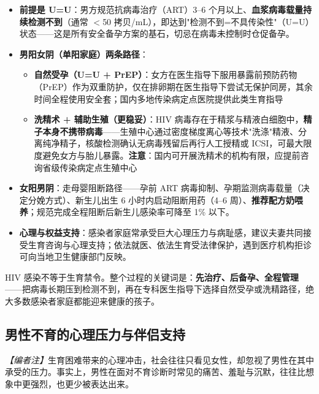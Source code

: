 \documentclass[12pt,a4paper,twoside]{ctexbook}
\begin{document}
\begin{itemize}
	\item \textbf{前提是 U=U}：男方规范抗病毒治疗（ART）3--6 个月以上、\textbf{血浆病毒载量持续检测不到}（通常 $<$50 拷贝/mL），即达到"检测不到=不具传染性"（U=U）状态——这是所有安全备孕方案的基石，切忌在病毒未控制时仓促备孕。
	\item \textbf{男阳女阴（单阳家庭）两条路径}：
	\begin{itemize}
		\item \textbf{自然受孕（U=U + PrEP）}：女方在医生指导下服用暴露前预防药物（PrEP）作为双重防护，仅在排卵期在医生指导下尝试无保护同房，其余时间全程使用安全套；国内多地传染病定点医院提供此类生育指导
		\item \textbf{洗精术 + 辅助生殖（更稳妥）}：HIV 病毒存在于精浆与精液白细胞中，\textbf{精子本身不携带病毒}——生殖中心通过密度梯度离心等技术"洗涤"精液、分离纯净精子，核酸检测确认无病毒残留后再行人工授精或 ICSI，可最大限度避免女方与胎儿暴露。\textbf{注意}：国内可开展洗精术的机构有限，应提前咨询省级传染病定点生殖中心
	\end{itemize}
	\item \textbf{女阳男阴}：走母婴阻断路径——孕前 ART 病毒抑制、孕期监测病毒载量（决定分娩方式）、新生儿出生 6 小时内启动阻断用药（4--6 周）、\textbf{推荐配方奶喂养}；规范完成全程阻断后新生儿感染率可降至 1\% 以下。
	\item \textbf{心理与权益支持}：感染者家庭常承受巨大心理压力与病耻感，建议夫妻共同接受生育咨询与心理支持；依法就医、依法生育受法律保护，遇到医疗机构拒诊可向当地卫生健康部门反映。
\end{itemize}

\begin{tcolorbox}[colback=pink!5!white,colframe=red!50!black,title=贴心小叮咛]
HIV 感染不等于生育禁令。整个过程的关键词是：\textbf{先治疗、后备孕、全程管理}——把病毒长期压到检测不到，再在专科医生指导下选择自然受孕或洗精路径，绝大多数感染者家庭都能迎来健康的孩子。
\end{tcolorbox}

\subsection{男性不育的心理压力与伴侣支持}
\label{subsec:male_infertility_psych}

\noindent\textit{【编者注】}生育困难带来的心理冲击，社会往往只看见女性，却忽视了男性在其中承受的压力。事实上，男性在面对不育诊断时常见的痛苦、羞耻与沉默，往往比想象中更强烈，也更少被表达出来。
\end{document}
